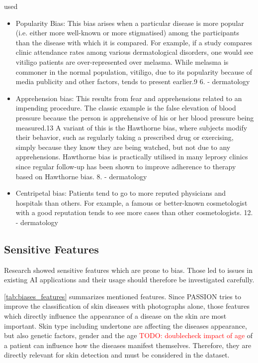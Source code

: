 \documentclass[12pt, a4paper, oneside]{book}   	%
\renewcommand{\todo}[1]{\textcolor{red}{TODO: #1}}
\newif\ifrawcitationactive
\newcommand{\rawcitationstart}{
	\color{purple}\rawcitationactivetrue
}
\newcommand{\rawcitationend}{
	\color{black}\rawcitationactivefalse
}
\newcommand{\rawcitationusedstart}{\color{violet}}
\newcommand{\rawcitationusedend}{%
	\ifrawcitationactive
	\color{purple}  %
	\else
	\color{black}  %
	\fi
}
\begin{document}
			
			\rawcitationstart
			used
			\begin{itemize}		
				\rawcitationusedstart
				\item Popularity Bias: This bias arises when a particular disease is more popular (i.e. either more well-known or more stigmatised) among the participants than the disease with which it is compared. For example, if a study compares clinic attendance rates among various dermatological disorders, one would see vitiligo patients are over-represented over melasma. While melasma is commoner in the normal population, vitiligo, due to its popularity because of media publicity and other factors, tends to present earlier.9 6. \autocite{Chakraborty_2024} - dermatology
				
				\item  Apprehension bias: This results from fear and apprehensions related to an impending procedure. The classic example is the false elevation of blood pressure because the person is apprehensive of his or her blood pressure being measured.13 A variant of this is the Hawthorne bias, where subjects modify their behavior, such as regularly taking a prescribed drug or exercising, simply because they know they are being watched, but not due to any apprehensions. Hawthorne bias is practically utilised in many leprosy clinics since regular follow-up has been shown to improve adherence to therapy based on Hawthorne bias. 8. \autocite{Chakraborty_2024} - dermatology
				
				\item Centripetal bias: Patients tend to go to more reputed physicians and hospitals than others. For example, a famous or better-known cosmetologist with a good reputation tends to see more cases than other cosmetologists. 12.\autocite{Chakraborty_2024}  - dermatology
				\rawcitationusedend
			\end{itemize}
			\rawcitationend
			
			
			\subsection{Sensitive Features}
			Research showed sensitive features which are prone to bias. Those led to issues in existing \gls{AI} applications and their usage should therefore be investigated carefully.
			
			\autoref{tab:biases_features} summarizes mentioned features. Since PASSION tries to improve the classification of skin diseases with photographs alone, those features which directly influence the appearance of a disease on the skin are most important. Skin type including undertone are affecting the diseases appearance, but also genetic factors, gender and the age \todo{doublecheck impact of age} of a patient can influence how the diseases manifest themselves. Therefore, they are directly relevant for skin detection and must be considered in the dataset.
			
\end{document}
